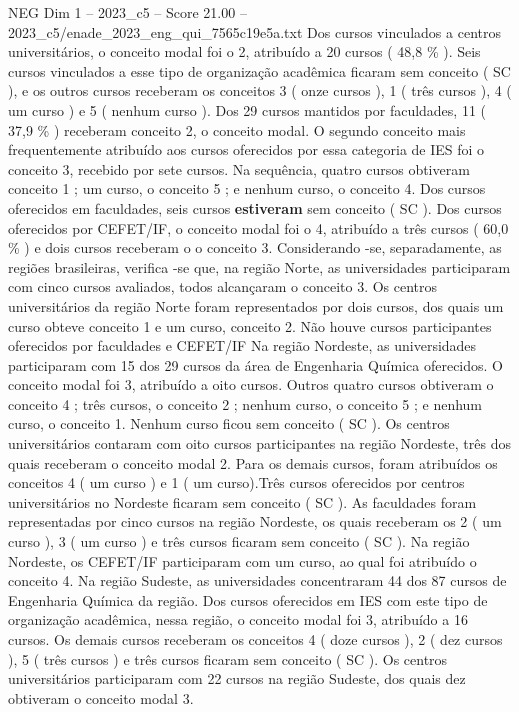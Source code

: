 \begin{textsample}{NEG Dim 1 – 2023\_c5 – Score 21.00 – 2023\_c5/enade\_2023\_eng\_qui\_7565c19e5a.txt}
Dos cursos vinculados a centros universitários, o conceito modal foi o 2, atribuído a 20 cursos ( 48,8 \% ).
Seis cursos vinculados a esse tipo de organização acadêmica ficaram sem conceito ( SC ), e os outros cursos receberam os conceitos 3 ( onze cursos ), 1 ( três cursos ), 4 ( um curso ) e 5 ( nenhum curso ).
Dos 29 cursos mantidos por faculdades, 11 ( 37,9 \% ) receberam conceito 2, o conceito modal.
O segundo conceito mais frequentemente atribuído aos cursos oferecidos por essa categoria de IES foi o conceito 3, recebido por sete cursos.
Na sequência, quatro cursos obtiveram conceito 1 ; um curso, o conceito 5 ; e nenhum curso, o conceito 4.
Dos cursos oferecidos em faculdades, seis cursos \textbf{estiveram} sem conceito ( SC ).
Dos cursos oferecidos por CEFET/IF, o conceito modal foi o 4, atribuído a três cursos ( 60,0 \% ) e dois cursos receberam o o conceito 3.
Considerando -se, separadamente, as regiões brasileiras, verifica -se que, na região Norte, as universidades participaram com cinco cursos avaliados, todos alcançaram o conceito 3.
Os centros universitários da região Norte foram representados por dois cursos, dos quais um curso obteve conceito 1 e um curso, conceito 2.
Não houve cursos participantes oferecidos por faculdades e CEFET/IF Na região Nordeste, as universidades participaram com 15 dos 29 cursos da área de Engenharia Química oferecidos.
O conceito modal foi 3, atribuído a oito cursos.
Outros quatro cursos obtiveram o conceito 4 ; três cursos, o conceito 2 ; nenhum curso, o conceito 5 ; e nenhum curso, o conceito 1.
Nenhum curso ficou sem conceito ( SC ).
Os centros universitários contaram com oito cursos participantes na região Nordeste, três dos quais receberam o conceito modal 2.
Para os demais cursos, foram atribuídos os conceitos 4 ( um curso ) e 1 ( um curso).Três cursos oferecidos por centros universitários no Nordeste ficaram sem conceito ( SC ).
As faculdades foram representadas por cinco cursos na região Nordeste, os quais receberam os 2 ( um curso ), 3 ( um curso ) e três cursos ficaram sem conceito ( SC ).
Na região Nordeste, os CEFET/IF participaram com um curso, ao qual foi atribuído o conceito 4.
Na região Sudeste, as universidades concentraram 44 dos 87 cursos de Engenharia Química da região.
Dos cursos oferecidos em IES com este tipo de organização acadêmica, nessa região, o conceito modal foi 3, atribuído a 16 cursos.
Os demais cursos receberam os conceitos 4 ( doze cursos ), 2 ( dez cursos ), 5 ( três cursos ) e três cursos ficaram sem conceito ( SC ).
Os centros universitários participaram com 22 cursos na região Sudeste, dos quais dez obtiveram o conceito modal 3.

\end{textsample}
